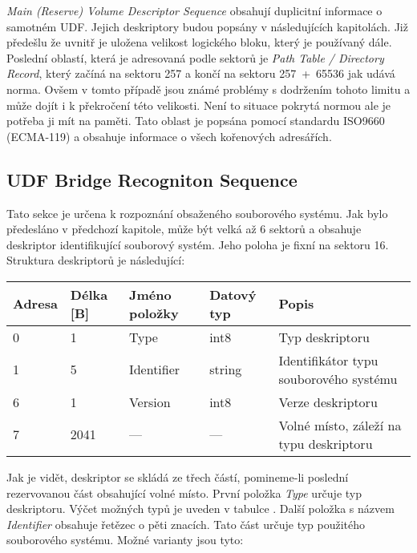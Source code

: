\textit{Main (Reserve) Volume Descriptor Sequence} obsahují duplicitní informace o samotném UDF. Jejich deskriptory budou popsány v následujících kapitolách. Již předešlu že uvnitř je uložena velikost logického bloku, který je používaný dále.\\
Poslední oblastí, která je adresovaná podle sektorů je \textit{Path Table / Directory Record}, který začíná na sektoru 257 a končí na sektoru 257~+~65536 jak udává norma. Ovšem v tomto případě jsou známé problémy s dodržením tohoto limitu a může dojít i k překročení této velikosti. Není to situace pokrytá normou ale je potřeba ji mít na paměti. Tato oblast je popsána pomocí standardu ISO9660 (ECMA-119) a obsahuje informace o všech kořenových adresářích.

\subsection{UDF Bridge Recogniton Sequence}
Tato sekce je určena k rozpoznání obsaženého souborového systému. Jak bylo předesláno v předchozí kapitole, může být velká až 6 sektorů a obsahuje deskriptor identifikující souborový systém. Jeho poloha je fixní na sektoru 16.\\
Struktura deskriptorů je následující:
\begin{center}
    \begin{tabular}{ | l | l | l | l | l | }
        \hline
        Adresa  & Délka [B]   & Jméno položky & Datový typ    & Popis \\ \hline
        0       & 1             & Type           & int8          & Typ deskriptoru \\ \hline
        1       & 5             & Identifier & string        & Identifikátor typu souborového systému \\ \hline
        6       & 1             & Version         & int8          & Verze deskriptoru \\ \hline
        7       & 2041          & ---           & ---           & Volné místo, záleží na typu deskriptoru \\ \hline
    \end{tabular}
\end{center}
Jak je vidět, deskriptor se skládá ze třech částí, pomineme-li poslední rezervovanou část obsahující volné místo. První položka \textit{Type} určuje typ deskriptoru. Výčet možných typů je uveden v tabulce . Další položka s názvem \textit{Identifier} obsahuje řetězec o pěti znacích. Tato část určuje typ použitého souborového systému. Možné varianty jsou tyto:
